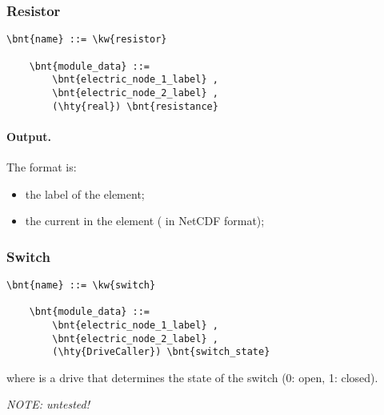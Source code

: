 \subsubsection{Resistor}
\label{sec:MODULE:FAB-ELECTRIC:RESISTOR}
\begin{Verbatim}[commandchars=\\\{\}]
    \bnt{name} ::= \kw{resistor}

    \bnt{module_data} ::=
        \bnt{electric_node_1_label} ,
        \bnt{electric_node_2_label} ,
        (\hty{real}) \bnt{resistance}
\end{Verbatim}

\paragraph{Output.}
\label{sec:MODULE:FAB-ELECTRIC:RESISTOR:OUTPUT}
The format is:
\begin{itemize}
\item the label of the element;
\item the current in the element ( in NetCDF format);
\end{itemize}


\subsubsection{Switch}
\begin{Verbatim}[commandchars=\\\{\}]
    \bnt{name} ::= \kw{switch}

    \bnt{module_data} ::=
        \bnt{electric_node_1_label} ,
        \bnt{electric_node_2_label} ,
        (\hty{DriveCaller}) \bnt{switch_state}
\end{Verbatim}
where  is a drive that determines the state of the switch (0: open, 1: closed).

\noindent
\emph{NOTE: untested!}



